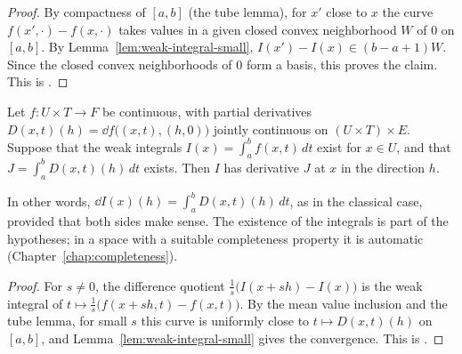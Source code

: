\begin{proof}
  \leanok
  By compactness of $[a, b]$ (the tube lemma), for $x'$ close to $x$ the curve
  $f(x', \cdot) - f(x, \cdot)$ takes values in a given closed convex neighborhood $W$ of $0$ on
  $[a, b]$. By Lemma~\ref{lem:weak-integral-small}, $I(x') - I(x) \in (b - a + 1)W$. Since
  the closed convex neighborhoods of $0$ form a basis, this proves the claim. This is
  \cite[1.1.11]{GN26}.
\end{proof}

\begin{theorem}
  \label{thm:diff-under-integral}
  \leanok
  Let $f \colon U \times T \to F$ be continuous, with partial derivatives
  $D(x,t)(h) = \dd f\bigl((x,t), (h, 0)\bigr)$ jointly continuous on $(U \times T) \times E$.
  Suppose that the weak integrals $I(x) = \int_a^b f(x, t)\, dt$ exist for $x \in U$, and that
  $J = \int_a^b D(x, t)(h)\, dt$ exists. Then $I$ has derivative $J$ at $x$ in the direction
  $h$.
\end{theorem}

In other words, $\dd I(x)(h) = \int_a^b D(x, t)(h)\, dt$, as in the classical case, provided
that both sides make sense. The existence of the integrals is part of the hypotheses; in a
space with a suitable completeness property it is automatic (Chapter~\ref{chap:completeness}).

\begin{proof}
  \leanok
  For $s \neq 0$, the difference quotient $\frac{1}{s}\bigl(I(x + sh) - I(x)\bigr)$ is the weak
  integral of $t \mapsto \frac{1}{s}\bigl(f(x + sh, t) - f(x, t)\bigr)$. By the mean value
  inclusion and the tube lemma, for small $s$ this curve is uniformly close to
  $t \mapsto D(x, t)(h)$ on $[a, b]$, and Lemma~\ref{lem:weak-integral-small} gives the
  convergence. This is \cite[1.3.15 and 1.3.23]{GN26}.
\end{proof}
